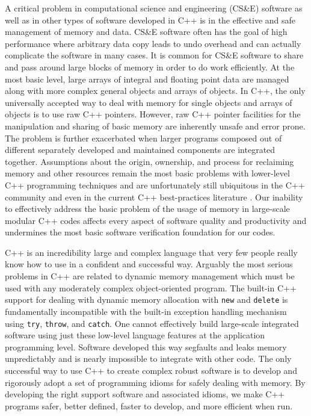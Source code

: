 \documentclass[pdf,ps2pdf,11pt]{SANDreport}
\begin{document}
A critical problem in computational science and engineering (CS\&E)
software as well as in other types of software developed in C++ is in
the effective and safe management of memory and data.  CS\&E software
often has the goal of high performance where arbitrary data copy leads
to undo overhead and can actually complicate the software in many
cases.  It is common for CS\&E software to share and pass around large
blocks of memory in order to do work efficiently.  At the most basic
level, large arrays of integral and floating point data are managed
along with more complex general objects and arrays of objects.  In
C++, the only universally accepted way to deal with memory for single
objects and arrays of objects is to use raw C++ pointers.  However,
raw C++ pointer facilities for the manipulation and sharing of basic
memory are inherently unsafe and error prone.  The problem is further
exacerbated when larger programs composed out of different separately
developed and maintained components are integrated together.
Assumptions about the origin, ownership, and process for reclaiming
memory and other resources remain the most basic problems with
lower-level C++ programming techniques and are unfortunately still
ubiquitous in the C++ community and even in the current C++
best-practices literature {}\cite{C++CodingStandards05,
EffectiveC++ThirdEdition}.  Our inability to effectively address the
basic problem of the usage of memory in large-scale modular C++ codes
affects every aspect of software quality and productivity and
undermines the most basic software verification foundation for our
codes.

C++ is an incredibility large and complex language that very few
people really know how to use in a confident and successful way.
Arguably the most serious problems in C++ are related to dynamic
memory management which must be used with any moderately complex
object-oriented program.  The built-in C++ support for dealing with
dynamic memory allocation with {}\texttt{new} and {}\texttt{delete} is
fundamentally incompatible with the built-in exception handling
mechanism using {}\texttt{try}, {}\texttt{throw}, and
{}\texttt{catch}.  One cannot effectively build large-scale integrated
software using just these low-level language features at the
application programming level.  Software developed this way segfaults
and leaks memory unpredictably and is nearly impossible to integrate
with other code.  The only successful way to use C++ to create complex
robust software is to develop and rigorously adopt a set of
programming idioms for safely dealing with memory.  By developing the
right support software and associated idioms, we make C++ programs
safer, better defined, faster to develop, and more efficient when run.
\end{document}
